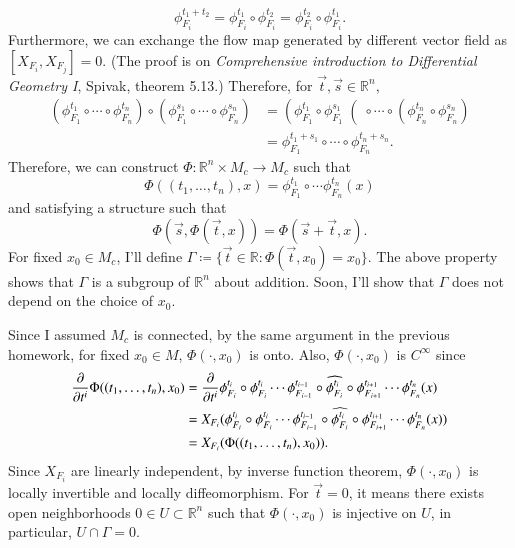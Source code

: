 \documentclass[a4paper, 12pt]{article}
\theoremstyle{Mydefinition}
\theoremstyle{Mytheorem}
\begin{document}
\begin{equation*}
    \phi^{t_1+t_2}_{F_i} = \phi^{t_1}_{F_i}\circ \phi^{t_2}_{F_i} = \phi^{t_2}_{F_i}\circ \phi^{t_1}_{F_i}.
\end{equation*}
Furthermore, we can exchange the flow map generated by different vector field as $[X_{F_i}, X_{F_j}] = 0$. (The proof is on \textit{Comprehensive introduction to Differential Geometry I}, Spivak, theorem 5.13.) Therefore, for $\vec{t},\vec{s}\in \mathbb{R}^n$,
\begin{equation*}
\begin{split}
    \left(\phi_{F_1}^{t_1}\circ \cdots \circ \phi_{F_n}^{t_n}\right) \circ \left(\phi_{F_1}^{s_1}\circ\cdots \circ \phi_{F_n}^{s_n}\right) &= \left(\phi_{F_1}^{t_1}\circ\phi_{F_1}^{s_1}\right(\circ \cdots \circ \left(\phi_{F_n}^{t_n} \circ\phi_{F_n}^{s_n}\right)\\
    &=\phi_{F_1}^{t_1+s_1}\circ \cdots \circ \phi_{F_n}^{t_n+s_n}.
\end{split}
\end{equation*}
Therefore, we can construct $\Phi:\mathbb{R}^n\times M_c\rightarrow M_c$ such that
\begin{equation*}
    \Phi((t_1,\ldots, t_n), x) = \phi_{F_1}^{t_1}\circ \cdots \phi_{F_n}^{t_n}(x)
\end{equation*}
and satisfying a structure such that
\begin{equation*}
    \Phi\left(\vec{s}, \Phi(\vec{t}, x)\right) = \Phi(\vec{s}+\vec{t}, x).
\end{equation*}
For fixed $x_0\in M_c$, I'll define $\Gamma \coloneqq \{\vec{t}\in\mathbb{R}:\Phi(\vec{t},x_0)=x_0\}$. The above property shows that $\Gamma$ is a subgroup of $\mathbb{R}^n$ about addition. Soon, I'll show that $\Gamma$ does not depend on the choice of $x_0$.

Since I assumed $M_c$ is connected, by the same argument in the previous homework, for fixed $x_0\in M$, $\Phi(\cdot, x_0)$ is onto. Also, $\Phi(\cdot, x_0)$ is $C^\infty$ since
\begin{equation*}
\begin{split}
    \pdv{t^i}\Phi((t_1, \ldots, t_n), x_0) &= \pdv{t^i}\phi_{F_i}^{t_i}\circ \phi_{F_i}^{t_i}\cdots \phi_{F_{i-1}}^{t_{i-1}}\circ \widehat{\phi_{F_{i}}^{t_{i}}}\circ \phi_{F_{i+1}}^{t_{i+1}}\cdots \phi_{F_n}^{t_n}(x) \\
    &= X_{F_i}(\phi_{F_{i}}^{t_{i}}\circ \phi_{F_i}^{t_i}\cdots \phi_{F_{i-1}}^{t_{i-1}}\circ \widehat{\phi_{F_{i}}^{t_{i}}}\circ \phi_{F_{i+1}}^{t_{i+1}}\cdots \phi_{F_n}^{t_n}(x))\\
    &=X_{F_i}(\Phi((t_1, \ldots, t_n), x_0)).
\end{split}
\end{equation*}
Since $X_{F_i}$ are linearly independent, by inverse function theorem, $\Phi(\cdot, x_0)$ is locally invertible and locally diffeomorphism. For $\vec{t} = 0$, it means there exists open neighborhoods $0\in U\subset \mathbb{R}^n$ such that $\Phi(\cdot, x_0)$ is injective on $U$, in particular, $U\cap \Gamma = 0$.
\end{document}
